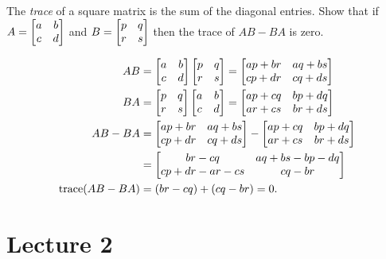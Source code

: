 \documentclass[a4paper]{amsart}
\renewenvironment{solution}{\SolutionInline}{\endSolutionInline}
\begin{document}
\begin{exercise}\label{ex-commutator-trace}
 The \emph{trace} of a square matrix is the sum of the diagonal
 entries.  Show that if $A=\left[\begin{matrix} a&b\\c&d\end{matrix}\right]$ and
 $B=\left[\begin{matrix} p&q\\r&s\end{matrix}\right]$ then the trace of $AB-BA$ is zero.
\end{exercise}
\begin{solution}
 \begin{align*}
  AB &= \left[\begin{matrix} a&b\\c&d\end{matrix}\right] \left[\begin{matrix} p&q\\r&s\end{matrix}\right]
      = \left[\begin{matrix} ap+br & aq+bs \\ cp+dr & cq+ds \end{matrix}\right] \\
  BA &= \left[\begin{matrix} p&q\\r&s\end{matrix}\right] \left[\begin{matrix} a&b\\c&d\end{matrix}\right]
      = \left[\begin{matrix} ap+cq & bp+dq \\ ar+cs & br+ds \end{matrix}\right] \\
  AB-BA &= \left[\begin{matrix} ap+br & aq+bs \\ cp+dr & cq+ds \end{matrix}\right] -
           \left[\begin{matrix} ap+cq & bp+dq \\ ar+cs & br+ds \end{matrix}\right] \\
        &= \left[\begin{matrix} br-cq & aq+bs-bp-dq \\ cp+dr-ar-cs & cq-br \end{matrix}\right] \\
  \text{trace}(AB-BA) &= (br-cq) + (cq-br) = 0. 
 \end{align*}
\end{solution}

\section{Lecture 2}
\end{document}
